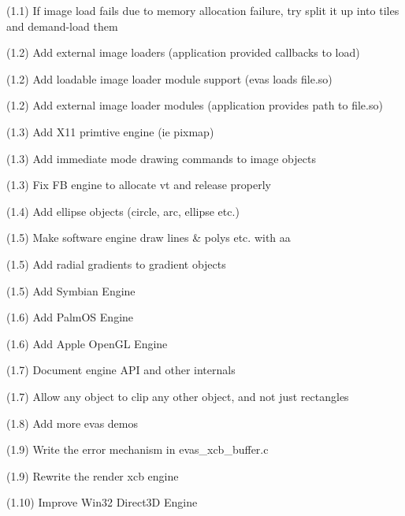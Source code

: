 \begin{Desc}
(1.1) If image load fails due to memory allocation failure, try split it up into tiles and demand-\/load them 

(1.2) Add external image loaders (application provided callbacks to load) 

(1.2) Add loadable image loader module support (evas loads file.so) 

(1.2) Add external image loader modules (application provides path to file.so) 

(1.3) Add X11 primtive engine (ie pixmap) 

(1.3) Add immediate mode drawing commands to image objects 

(1.3) Fix FB engine to allocate vt and release properly 

(1.4) Add ellipse objects (circle, arc, ellipse etc.) 

(1.5) Make software engine draw lines \& polys etc. with aa 

(1.5) Add radial gradients to gradient objects 

(1.5) Add Symbian Engine 

(1.6) Add PalmOS Engine 

(1.6) Add Apple OpenGL Engine 

(1.7) Document engine API and other internals 

(1.7) Allow any object to clip any other object, and not just rectangles 

(1.8) Add more evas demos 

(1.9) Write the error mechanism in evas\_\-xcb\_\-buffer.c 

(1.9) Rewrite the render xcb engine 

(1.10) Improve Win32 Direct3D Engine\end{Desc}
